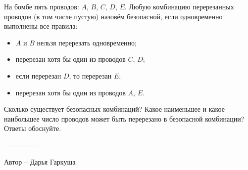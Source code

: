 \question
На бомбе пять проводов: $A$, $B$, $C$, $D$, $E$. Любую комбинацию перерезанных проводов (в том числе пустую) назовём безопасной, если одновременно выполнены все правила:
\begin{itemize}
    \item $A$ и $B$ нельзя перерезать одновременно;
    \item перерезан хотя бы один из проводов $C$, $D$;
    \item если перерезан $D$, то перерезан $E$;
    \item перерезан хотя бы один из проводов $A$, $E$.
\end{itemize}
Сколько существует безопасных комбинаций? Какое наименьшее и какое наибольшее число проводов может быть перерезано в безопасной комбинации? Ответы обоснуйте.

---------------

Автор -- Дарья Гаркуша